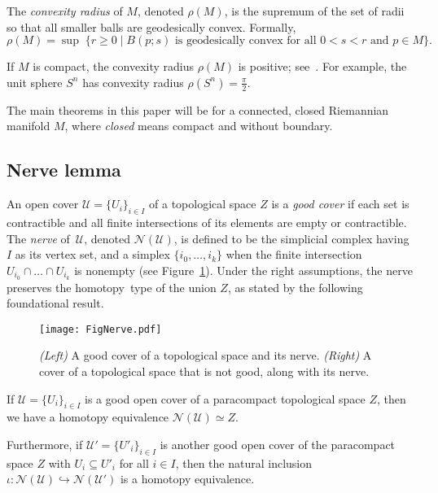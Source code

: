 \documentclass[11pt, reqno, english]{amsart}
\def\U{\mathcal U}
\def\N{\mathcal N}
\begin{document}
\vspace{3mm}
\begin{definition}
\label{def:conv-rad}
The \emph{convexity radius} of $M$, denoted $\rho(M)$, is the supremum of the set of radii so that all smaller balls are geodesically convex.
Formally,
\[
\rho(M)=\sup\;\{r\geq0\mid B(p;s)
\text{ is geodesically convex for all }0<s<r\text{ and }p\in M\}.	
\]
\end{definition}

If $M$ is compact, the convexity radius $\rho(M)$ is positive; see~\cite[Proposition~95]{berger2007panoramic}.
For example, the unit sphere $S^n$ has
convexity radius $\rho(S^n)=\tfrac{\pi}{2}$.

The main theorems in this paper will be for a connected, closed Riemannian manifold $M$, where \emph{closed} means compact and without boundary.


\subsection*{Nerve lemma}

An open cover $\U=\{U_i\}_{i\in I}$ of a topological space $Z$ is a \emph{good cover} if each set is contractible and all finite intersections of its elements are empty or contractible.
The \emph{nerve} of~$\U$, denoted $\N(\U)$, is defined to be the simplicial
complex having $I$ as its vertex set, and a simplex $\{i_0,\ldots,i_k\}$ when the finite intersection $U_{i_0}\cap\ldots\cap U_{i_k}$ is nonempty (see Figure~\ref{fig:nerve}).
Under the right assumptions,
the nerve preserves the homotopy~type of the union $Z$, as stated by the
following foundational result.

\begin{figure}[htb]
\centering
\texttt{[image: FigNerve.pdf]}
\caption{\emph{(Left)} A good cover of a topological space and its nerve.
\emph{(Right)} A cover of a topological space that is not good, along with its nerve.}
\label{fig:nerve}
\end{figure}

\vspace{3mm}
\begin{lemma}
\label{lem:nerve}
If $\U=\{U_i\}_{i\in I}$ is a good open cover of a paracompact topological space $Z$, then we have a homotopy equivalence $\N(\U)\simeq Z$.

Furthermore, if $\U'=\{U'_i\}_{i\in I}$ is another good open cover of the paracompact space $Z$ with $U_i\subseteq U'_i$ for all $i\in I$, then the natural inclusion $\iota\colon \N(\U)\hookrightarrow\N(\U')$ is a homotopy equivalence.
\end{lemma}
\vspace{3mm}
\end{document}
